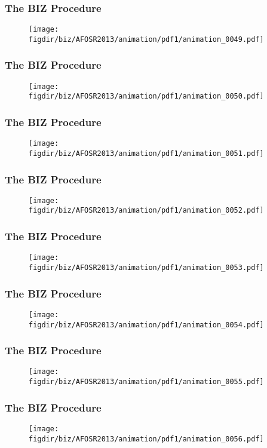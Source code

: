\documentclass[13pt]{beamer}
\newcommand{\figdir}{../../fig}
\begin{document}
\begin{frame}\frametitle{The BIZ Procedure}\begin{figure}\texttt{[image: \\figdir/biz/AFOSR2013/animation/pdf1/animation\_0049.pdf]}\end{figure}\end{frame}
\begin{frame}\frametitle{The BIZ Procedure}\begin{figure}\texttt{[image: \\figdir/biz/AFOSR2013/animation/pdf1/animation\_0050.pdf]}\end{figure}\end{frame}
\begin{frame}\frametitle{The BIZ Procedure}\begin{figure}\texttt{[image: \\figdir/biz/AFOSR2013/animation/pdf1/animation\_0051.pdf]}\end{figure}\end{frame}
\begin{frame}\frametitle{The BIZ Procedure}\begin{figure}\texttt{[image: \\figdir/biz/AFOSR2013/animation/pdf1/animation\_0052.pdf]}\end{figure}\end{frame}
\begin{frame}\frametitle{The BIZ Procedure}\begin{figure}\texttt{[image: \\figdir/biz/AFOSR2013/animation/pdf1/animation\_0053.pdf]}\end{figure}\end{frame}
\begin{frame}\frametitle{The BIZ Procedure}\begin{figure}\texttt{[image: \\figdir/biz/AFOSR2013/animation/pdf1/animation\_0054.pdf]}\end{figure}\end{frame}
\begin{frame}\frametitle{The BIZ Procedure}\begin{figure}\texttt{[image: \\figdir/biz/AFOSR2013/animation/pdf1/animation\_0055.pdf]}\end{figure}\end{frame}
\begin{frame}\frametitle{The BIZ Procedure}\begin{figure}\texttt{[image: \\figdir/biz/AFOSR2013/animation/pdf1/animation\_0056.pdf]}\end{figure}\end{frame}
\end{document}
